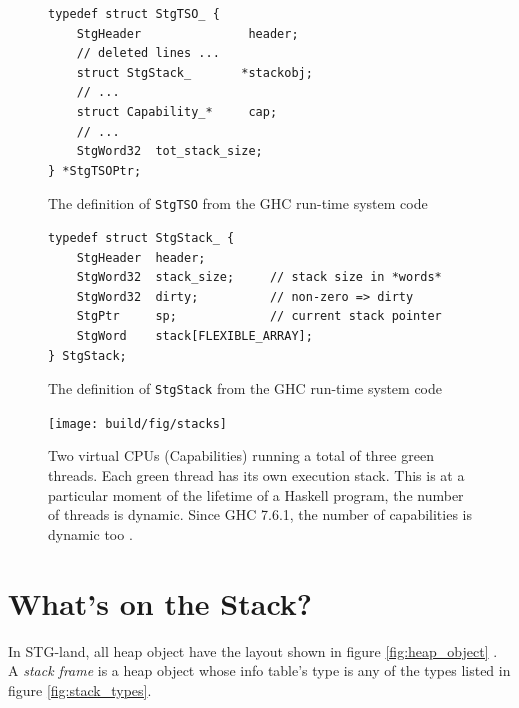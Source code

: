 \begin{figure}
\begin{mdframed}
  \begin{verbatim}
typedef struct StgTSO_ {
    StgHeader               header;
    // deleted lines ...
    struct StgStack_       *stackobj;
    // ...
    struct Capability_*     cap;
    // ...
    StgWord32  tot_stack_size;
} *StgTSOPtr;
  \end{verbatim}
  \caption{The definition of \texttt{StgTSO} from the GHC run-time system
code}
  \label{fig:tso_definition}
\end{mdframed}
\end{figure}

\begin{figure}
\begin{mdframed}
  \begin{verbatim}
typedef struct StgStack_ {
    StgHeader  header;
    StgWord32  stack_size;     // stack size in *words*
    StgWord32  dirty;          // non-zero => dirty
    StgPtr     sp;             // current stack pointer
    StgWord    stack[FLEXIBLE_ARRAY];
} StgStack;
  \end{verbatim}
  \caption{The definition of \texttt{StgStack} from the GHC run-time system
code}
  \label{fig:stack_definition}
\end{mdframed}
\end{figure}

\begin{figure}
  \centering
  \texttt{[image: build/fig/stacks]}
  \caption{Two virtual CPUs (Capabilities) running a total of three
green threads. Each green thread has its own execution stack.
This is at a particular moment of the lifetime of a Haskell program,
the number of threads is dynamic. Since GHC 7.6.1, the number of
capabilities is dynamic too \cite{haskell_org_release_7.6.1}.}
  \label{fig:stacks}
\end{figure}

\section{What's on the Stack?} \label{sec:whats_on_the_stack}

In STG-land, all heap object have the layout shown in figure
\ref{fig:heap_object} \cite{commentary_heap_objects}.
A \emph{stack frame} is a heap object whose
info table's type is any of the types listed in figure \ref{fig:stack_types}.

